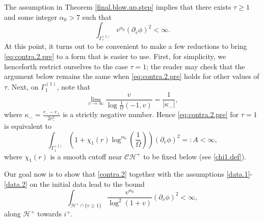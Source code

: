 \documentclass[12 pt, reqno]{amsart}
\newcommand{\comment}[1]{\begingroup\color{red} \tt #1\endgroup} %
\newtheorem{theorem}{Theorem}[section]
\theoremstyle{definition}
\theoremstyle{remark}
\numberwithin{equation}{section}
\newcommand{\abs}[1]{\vert#1\vert}
\newcommand{\rd}{\partial}
\newcommand{\bb}{\Big}
\newcommand{\0}{\emptyset}
\newcommand{\alp}{\alpha}
\newcommand{\Gmm}{\Gamma}
\newcommand{\kpp}{\kappa}
\newcommand{\Omg}{\Omega}
\newcommand{\calC}{\mathcal C}
\newcommand{\calH}{\mathcal H}
\newcommand{\f}{\frac}
\newcommand{\CH}{\calC \calH^{+}}		%
\newcommand{\EH}{\calH^{+}}
\begin{document}


The assumption in Theorem \ref{final.blow.up.step} implies that there exists $\tau \geq 1$ and some integer $\alp_0>7$ such that 
\begin{equation} \label{eq:contra.2.pre}
	\int_{\Gmm^{(1)}_{\tau}} v^{\alp_{0}} (\rd_{v} \phi)^{2} < \infty.
\end{equation}
At this point, it turns out to be convenient to make a few reductions to bring \eqref{eq:contra.2.pre} to a form that is easier to use.
First, for simplicity, we henceforth restrict ourselves to the case $\tau = 1$; the reader may check that the argument below remains the same when \eqref{eq:contra.2.pre} holds for other values of $\tau$. Next, on $\Gmm^{(1)}_{1}$, note that
\begin{equation*}
	\lim_{v \to \infty} \frac{v}{\log \frac{1}{\Omg} (-1, v)} = \frac{1}{\abs{\kpp_{-}}},
\end{equation*}
where $\kpp_{-} = \frac{r_{-} - r_{+}}{2 r_{-}^{2}}$ is a strictly negative number. Hence \eqref{eq:contra.2.pre} for $\tau = 1$ is equivalent to
\begin{equation} \label{contra.2}
	\int_{\Gmm^{(1)}_{1}} (1 + \chi_{1}(r) \log^{\alp_{0}} (\frac{1}{\Omg})) (\rd_{v} \phi)^{2}  =: A < \infty,
\end{equation}
where $\chi_{1}(r)$ is a smooth cutoff near $\CH$ to be fixed below (see \eqref{chi1.def}). 

Our goal now is to show that \eqref{contra.2} together with the assumptions \eqref{data.1}-\eqref{data.2} on the initial data lead to the bound
\begin{equation}\label{contra.2.goal}
	\int_{\EH\cap\{v\geq 1\}} \f{v^{\alp_0}}{\log^2(1+v)} (\rd_{v} \phi)^{2} < \infty,
\end{equation}
along $\mathcal H^+$ towards $i^{+}$.
\end{document}
